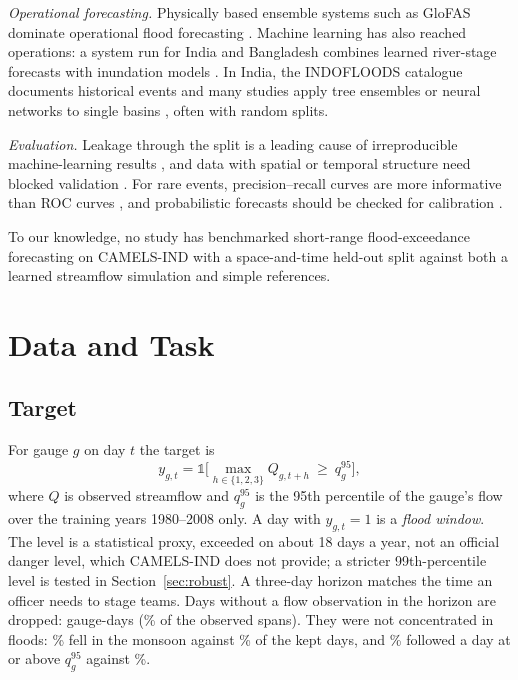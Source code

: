 \documentclass[conference]{IEEEtran}
\begin{document}
\textit{Operational forecasting.} Physically based ensemble systems such as GloFAS \cite{Alfieri2013} dominate operational flood forecasting \cite{Cloke2009}. Machine learning has also reached operations: a system run for India and Bangladesh combines learned river-stage forecasts with inundation models \cite{Nevo2022}. In India, the INDOFLOODS catalogue documents historical events \cite{Kuntla2025} and many studies apply tree ensembles or neural networks to single basins \cite{Mosavi2018}, often with random splits.

\textit{Evaluation.} Leakage through the split is a leading cause of irreproducible machine-learning results \cite{Kapoor2023}, and data with spatial or temporal structure need blocked validation \cite{Roberts2017}. For rare events, precision--recall curves are more informative than ROC curves \cite{Saito2015}, and probabilistic forecasts should be checked for calibration \cite{Brier1950}.

To our knowledge, no study has benchmarked short-range flood-exceedance forecasting on CAMELS-IND with a space-and-time held-out split against both a learned streamflow simulation and simple references.


\section{Data and Task}
\subsection{Target}
For gauge $g$ on day $t$ the target is
\begin{equation}
y_{g,t}=\mathbb{1}\Big[\max_{h\in\{1,2,3\}} Q_{g,t+h}\ \ge\ q^{95}_g\Big],
\label{eq:target}
\end{equation}
where $Q$ is observed streamflow and $q^{95}_g$ is the 95th percentile of the gauge's flow over the training years 1980--2008 only. A day with $y_{g,t}=1$ is a \emph{flood window}. The level is a statistical proxy, exceeded on about 18 days a year, not an official danger level, which CAMELS-IND does not provide; a stricter 99th-percentile level is tested in Section~\ref{sec:robust}. A three-day horizon matches the time an officer needs to stage teams. Days without a flow observation in the horizon are dropped: \DropN{} gauge-days (\DropPct\% of the observed spans). They were not concentrated in floods: \DropMon\% fell in the monsoon against \KeptMon\% of the kept days, and \DropHigh\% followed a day at or above $q^{95}_g$ against \KeptHigh\%.
\end{document}
